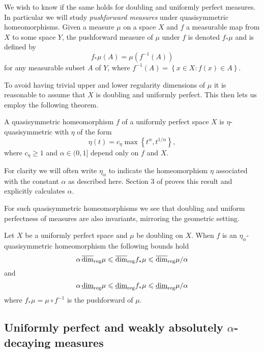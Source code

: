We wish to know if the same holds for doubling and uniformly perfect measures. In particular we will study \textit{pushforward measures} under quasisymmetric homeomorphisms. Given a measure $\mu$ on a space $X$ and $f$ a measurable map from $X$ to some space $Y$, the pushforward measure of $\mu$ under $f$ is denoted $f_*\mu$ and is defined by
\[
f_*\mu (A) = \mu(f^{-1}(A))
\]
for any measurable subset $A$ of $Y$, where $f^{-1}(A) = \left\{x \in X \colon f(x) \in A \right\}$. 

To avoid having trivial upper and lower regularity dimensions of $\mu$ it is reasonable to assume that $X$ is doubling and uniformly perfect. This then lets us employ the following theorem. 

\begin{theorem}
	A quasisymmetric homeomorphism $f$ of a uniformly perfect space $X$ is $\eta$-quasisymmetric with $\eta$ of the form
	\[
	\eta(t) = c_\eta \max\left\{t^\alpha, t^{1/\alpha}\right\},
	\]
	where $c_\eta \ge 1 $ and $\alpha \in (0,1]$ depend only on $f$ and $X$.
\end{theorem}
For clarity we will often write $\eta_{\alpha}$ to indicate the homeomorphism $\eta$ associated with the constant $\alpha$ as described here. Section 3 of \cite{tukia-vaisala} proves this result and explicitly calculates $\alpha$. 

For such quasisymmetric homeomorphisms we see that doubling and uniform perfectness of measures are also invariants, mirroring the geometric setting.

\begin{theorem}\label{ch-quantifying:quaisymm-thm}
	Let $X$ be a uniformly perfect space and $\mu$ be doubling on $X$. When $f$ is an $\eta_\alpha$-quasisymmetric homeomorphism the following bounds hold
	\[
	\alpha \, \overline{\dim}_{\textup{reg}} \mu \leqslant \overline{\dim}_{\textup{reg}} f_{*}\mu \leqslant \overline{\dim}_{\textup{reg}} \mu/\alpha
	\]
	and 
	\[
	\alpha \, \underline{\dim}_{\textup{reg}} \mu \leqslant \underline{\dim}_{\textup{reg}} f_{*}\mu \leqslant \underline{\dim}_{\textup{reg}} \mu/\alpha
	\]
	where $f_{*}\mu = \mu \circ f^{-1}$ is the pushforward of $\mu$.
\end{theorem}



\subsection{Uniformly perfect and weakly absolutely $\alpha$-decaying measures}\label{ch-quantifying:sec:diophantine}

